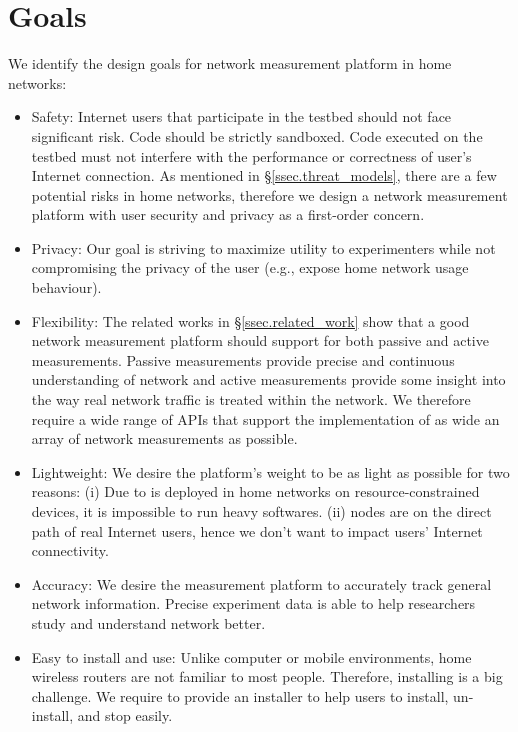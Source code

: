\section{Goals}
\label{ssec.goals}
We identify the design goals for network measurement platform in home 
networks:
\begin{itemize}
\item Safety: Internet users that participate in the testbed should not face significant risk. Code should be strictly sandboxed. Code executed on the testbed must not interfere with the performance or correctness of user's Internet connection. As mentioned in \S{\ref{ssec.threat_models}}, there are a few potential risks in home networks, therefore we design a network measurement platform with user security and privacy as a first-order concern.

\item Privacy: Our goal is striving to maximize utility to experimenters while not compromising the privacy of the user (e.g., expose home network usage behaviour).

\item Flexibility: The related works in \S{\ref{ssec.related_work}} show that a good network measurement platform should support for both passive and active measurements. Passive measurements provide precise and continuous understanding of network and active measurements provide some insight into the way real network traffic is treated within the network. We therefore require a wide range of APIs that support the implementation of as wide an array of network measurements as possible.

\item Lightweight: We desire the platform's weight to be as light as possible for two reasons: (i) Due to \sysname is deployed in home networks on resource-constrained devices, it is impossible to run heavy softwares. (ii) \sysname nodes are on the direct path of real Internet users, hence we don't want to impact users' Internet connectivity.

\item Accuracy: We desire the measurement platform to accurately track 
general network information. Precise experiment data is able to help researchers study and understand network better.

\item Easy to install and use: Unlike computer or mobile environments, home wireless routers are not familiar to most people. Therefore, installing is a big challenge. We require to provide an installer to help users to install, un-install, and stop easily.
\end{itemize}

